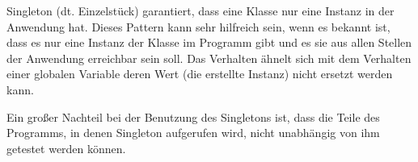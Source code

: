 Singleton (dt. Einzelstück) garantiert, dass eine Klasse nur eine Instanz in der Anwendung hat.
Dieses Pattern kann sehr hilfreich sein, wenn es bekannt ist, dass es nur eine Instanz der Klasse im Programm gibt 
und es sie aus allen Stellen der Anwendung erreichbar sein soll.
Das Verhalten ähnelt sich mit dem Verhalten einer 
globalen Variable deren Wert (die erstellte Instanz) nicht ersetzt werden kann.

Ein großer Nachteil bei der Benutzung des Singletons ist, 
dass die Teile des Programms, in denen Singleton aufgerufen wird, nicht unabhängig von ihm getestet werden können.